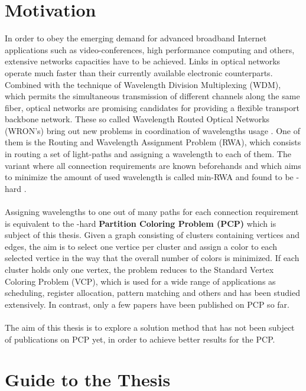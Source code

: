 \section{Motivation}

In order to obey the emerging demand for advanced broadband Internet applications such as video-conferences, high performance computing and others, extensive networks capacities have to be achieved. Links in optical networks operate much faster than their currently available electronic counterparts. Combined with the technique of Wavelength Division Multiplexing (WDM), which permits the simultaneous transmission of different channels along the same fiber, optical networks are promising candidates for providing a flexible transport backbone network. These so called Wavelength Routed Optical Networks (WRON's) bring out new problems in coordination of wavelengths usage \cite{murthy-02}. One of them is the Routing and Wavelength Assignment Problem (RWA), which consists in routing a set of light-paths and assigning a wavelength to each of them. The variant where all connection requirements are known beforehands and which aims to minimize the amount of used wavelength is called min-RWA and found to be -hard \cite{erlebach-01}.\\\\
Assigning wavelengths to one out of many paths for each connection requirement is equivalent to the -hard \textbf{Partition Coloring Problem (PCP)} \cite{li-00} which is subject of this thesis. Given a graph consisting of clusters containing vertices and edges, the aim is to select one vertice per cluster and assign a color to each selected vertice in the way that the overall number of colors is minimized. If each cluster holds only one vertex, the problem reduces to the Standard Vertex Coloring Problem (VCP), which is used for a wide range of applications as scheduling, register allocation, pattern matching and others and has been studied extensively. In contrast, only a few papers have been published on PCP so far.\\\\
The aim of this thesis is to explore a solution method that has not been subject of publications on PCP yet,	in order to achieve better results for the PCP. 

%
%


\section{Guide to the Thesis}


